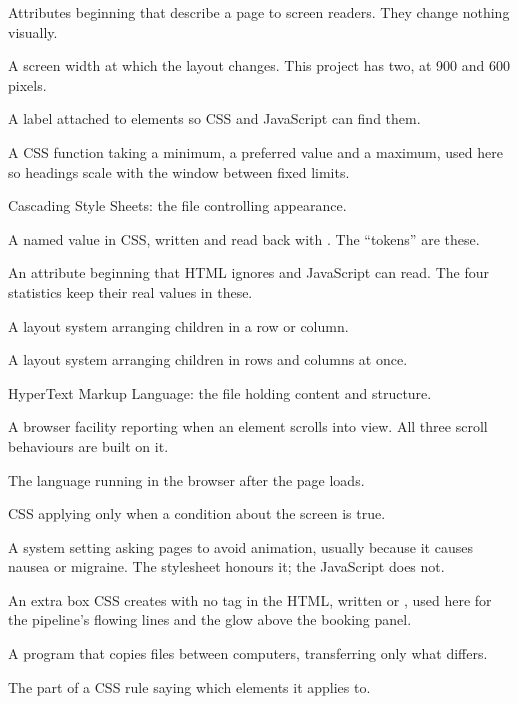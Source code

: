 \documentclass[11pt,a4paper]{article}
\begin{document}
\begin{description}[leftmargin=0pt,style=nextline]
\item[ARIA] Attributes beginning  that describe a page to screen
  readers. They change nothing visually.
\item[Breakpoint] A screen width at which the layout changes. This project has
  two, at 900 and 600 pixels.
\item[Class] A label attached to elements so CSS and JavaScript can find them.
\item[clamp] A CSS function taking a minimum, a preferred value and a maximum, used
  here so headings scale with the window between fixed limits.
\item[CSS] Cascading Style Sheets: the file controlling appearance.
\item[Custom property] A named value in CSS, written  and read back
  with . The ``tokens'' are these.
\item[Data attribute] An attribute beginning  that HTML ignores and
  JavaScript can read. The four statistics keep their real values in these.
\item[Flexbox] A layout system arranging children in a row or column.
\item[Grid] A layout system arranging children in rows and columns at once.
\item[HTML] HyperText Markup Language: the file holding content and structure.
\item[IntersectionObserver] A browser facility reporting when an element scrolls
  into view. All three scroll behaviours are built on it.
\item[JavaScript] The language running in the browser after the page loads.
\item[Media query] CSS applying only when a condition about the screen is true.
\item[prefers-reduced-motion] A system setting asking pages to avoid animation,
  usually because it causes nausea or migraine. The stylesheet honours it; the
  JavaScript does not.
\item[Pseudo-element] An extra box CSS creates with no tag in the HTML, written
   or , used here for the pipeline's flowing lines
  and the glow above the booking panel.
\item[rsync] A program that copies files between computers, transferring only what
  differs.
\item[Selector] The part of a CSS rule saying which elements it applies to.

\end{description}
\end{document}
